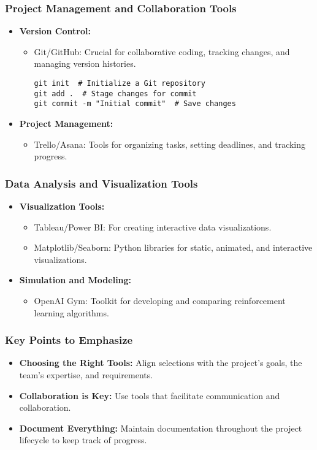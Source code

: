 \documentclass{beamer}
\begin{document}
\begin{frame}[fragile]
    \frametitle{Project Management and Collaboration Tools}
    \begin{itemize}
        \item \textbf{Version Control:}
        \begin{itemize}
            \item Git/GitHub: Crucial for collaborative coding, tracking changes, and managing version histories.
            \begin{lstlisting}
git init  # Initialize a Git repository
git add .  # Stage changes for commit
git commit -m "Initial commit"  # Save changes
            \end{lstlisting}
        \end{itemize}
        
        \item \textbf{Project Management:}
        \begin{itemize}
            \item Trello/Asana: Tools for organizing tasks, setting deadlines, and tracking progress.
        \end{itemize}
    \end{itemize}
\end{frame}

\begin{frame}[fragile]
    \frametitle{Data Analysis and Visualization Tools}
    \begin{itemize}
        \item \textbf{Visualization Tools:}
        \begin{itemize}
            \item Tableau/Power BI: For creating interactive data visualizations.
            \item Matplotlib/Seaborn: Python libraries for static, animated, and interactive visualizations.
        \end{itemize}
        
        \item \textbf{Simulation and Modeling:}
        \begin{itemize}
            \item OpenAI Gym: Toolkit for developing and comparing reinforcement learning algorithms.
        \end{itemize}
    \end{itemize}
\end{frame}

\begin{frame}[fragile]
    \frametitle{Key Points to Emphasize}
    \begin{itemize}
        \item \textbf{Choosing the Right Tools:} Align selections with the project’s goals, the team’s expertise, and requirements.
        \item \textbf{Collaboration is Key:} Use tools that facilitate communication and collaboration.
        \item \textbf{Document Everything:} Maintain documentation throughout the project lifecycle to keep track of progress.
    \end{itemize}
\end{frame}
\end{document}

